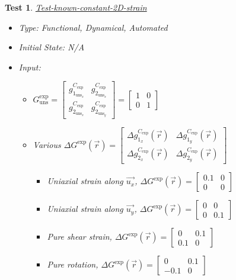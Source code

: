 \documentclass[12pt, titlepage]{article}
\newtheorem{Test}{Test}
\begin{document}
\begin{Test}\normalfont\underline{Test-known-constant-2D-strain}
\label{T_known-constant-2D-strain}
\begin{itemize}
\item Type: Functional, Dynamical, Automated
\item Initial State: N/A
\item Input:
\begin{itemize}
	\item $G_{\text{uns}}^{\text{exp}} =
	\begin{bmatrix}
	g_{1_{{\text{uns}}_x}}^{C_{\text{exp}}} & g_{2_{{\text{uns}}_x}}^{C_{\text{exp}}} \\
	g_{2_{{\text{uns}}_x}}^{C_{\text{exp}}} & g_{2_{{\text{uns}}_y}}^{C_{\text{exp}}} 
	\end{bmatrix} =\begin{bmatrix}
	1 & 0 \\
	0 & 1 
	\end{bmatrix}$
	\item Various $\Delta G^{\text{exp}}(\vec{r}) =
	\begin{bmatrix}
	\Delta g_{1_{x}}^{C_{\text{exp}}}(\vec{r}) & \Delta g_{1_{y}}^{C_{\text{exp}}}(\vec{r}) \\
	\Delta g_{2_{x}}^{C_{\text{exp}}}(\vec{r}) & \Delta g_{2_{y}}^{C_{\text{exp}}}(\vec{r})
	\end{bmatrix}$
		\begin{itemize}
		\item Uniaxial strain along $\vec{u_x}$, $\Delta G^{\text{exp}}(\vec{r}) = \begin{bmatrix}
	0.1 & 0 \\
	0 & 0 
	\end{bmatrix} $
		\item Uniaxial strain along $\vec{u_y}$, $\Delta G^{\text{exp}}(\vec{r}) = \begin{bmatrix}
	0 & 0 \\
	0 & 0.1 
	\end{bmatrix} $
		\item Pure shear strain, $\Delta G^{\text{exp}}(\vec{r}) = \begin{bmatrix}
	0 & 0.1 \\
	0.1 & 0 
	\end{bmatrix} $
		\item Pure rotation, $\Delta G^{\text{exp}}(\vec{r}) = \begin{bmatrix}
	0 & 0.1 \\
	-0.1 & 0 
	\end{bmatrix} $
		\end{itemize}	
	

\end{itemize}
\end{itemize}
\end{Test}
\end{document}

